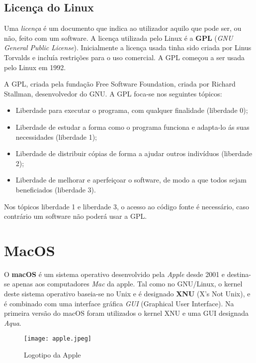 \documentclass{report}
\begin{document}
\section{Licença do Linux}

Uma \textit{licença} é um documento que indica ao utilizador aquilo que pode ser, ou não, feito com um software. A licença utilizada pelo Linux é a \textbf{GPL} (\textit{GNU General Public License}). Inicialmente a licença usada tinha sido criada por Linus Torvalds e incluía restrições para o uso comercial. A GPL começou a ser usada pelo Linux em 1992.

\vspace{5mm}

A GPL, criada pela fundação Free Software Foundation, criada por Richard Stallman, desenvolvedor do GNU. A GPL foca-se nos seguintes tópicos:

\begin{itemize}
    \item Liberdade para executar o programa, com qualquer finalidade (liberdade 0);
    \item Liberdade de estudar a forma como o programa funciona e adapta-lo ás suas necessidades (liberdade 1);
    \item Liberdade de distribuir cópias de forma a ajudar outros indivíduos (liberdade 2);
    \item Liberdade de melhorar e aperfeiçoar o software, de modo a que todos sejam beneficiados (liberdade 3).
\end{itemize}

Nos tópicos liberdade 1 e liberdade 3, o acesso ao código fonte é necessário, caso contrário um software não poderá usar a GPL.

\chapter{MacOS}
\label{chap.macos}

O \textbf{macOS} é um sistema operativo desenvolvido pela \textit{Apple} desde 2001 e destina-se apenas aos computadores \textit{Mac} da apple. Tal como no GNU/Linux, o kernel deste sistema operativo baseia-se no Unix e é designado \textbf{XNU} (X’s Not Unix), e é combinado com uma interface gráfica \textit{GUI} (Graphical User Interface). Na primeira versão do macOS foram utilizados o kernel XNU e uma GUI designada \textit{Aqua}.

\begin{figure}[h!]
    \centering
    \texttt{[image: apple.jpeg]}
    \caption{Logotipo da Apple}
\end{figure}
\end{document}
